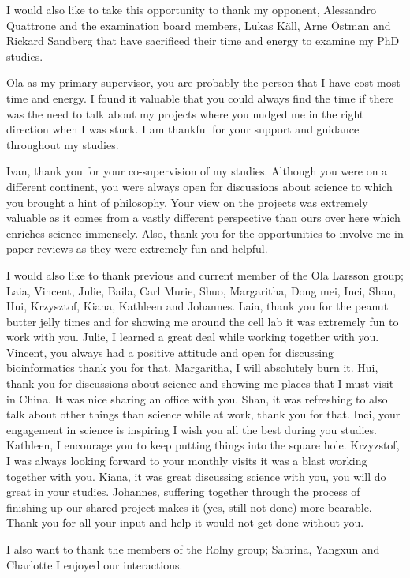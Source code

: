 \documentclass[12pt,openany]{book}
\begin{document}
I would also like to take this opportunity to thank my opponent,
Alessandro Quattrone and the examination board members, Lukas Käll, Arne
Östman and Rickard Sandberg that have sacrificed their time and energy
to examine my PhD studies.

Ola as my primary supervisor, you are probably the person that I have
cost most time and energy. I found it valuable that you could always
find the time if there was the need to talk about my projects where you
nudged me in the right direction when I was stuck. I am thankful for
your support and guidance throughout my studies.

Ivan, thank you for your co-supervision of my studies. Although you were
on a different continent, you were always open for discussions about
science to which you brought a hint of philosophy. Your view on the
projects was extremely valuable as it comes from a vastly different
perspective than ours over here which enriches science immensely. Also,
thank you for the opportunities to involve me in paper reviews as they
were extremely fun and helpful.

I would also like to thank previous and current member of the Ola
Larsson group; Laia, Vincent, Julie, Baila, Carl Murie, Shuo,
Margaritha, Dong mei, Inci, Shan, Hui, Krzysztof, Kiana, Kathleen and
Johannes. Laia, thank you for the peanut butter jelly times and for
showing me around the cell lab it was extremely fun to work with you.
Julie, I learned a great deal while working together with you. Vincent,
you always had a positive attitude and open for discussing
bioinformatics thank you for that. Margaritha, I will absolutely burn
it. Hui, thank you for discussions about science and showing me places
that I must visit in China. It was nice sharing an office with you.
Shan, it was refreshing to also talk about other things than science
while at work, thank you for that. Inci, your engagement in science is
inspiring I wish you all the best during you studies. Kathleen, I
encourage you to keep putting things into the square hole. Krzyzstof, I
was always looking forward to your monthly visits it was a blast working
together with you. Kiana, it was great discussing science with you, you
will do great in your studies. Johannes, suffering together through the
process of finishing up our shared project makes it (yes, still not
done) more bearable. Thank you for all your input and help it would not
get done without you.

I also want to thank the members of the Rolny group; Sabrina, Yangxun
and Charlotte I enjoyed our interactions.
\end{document}
